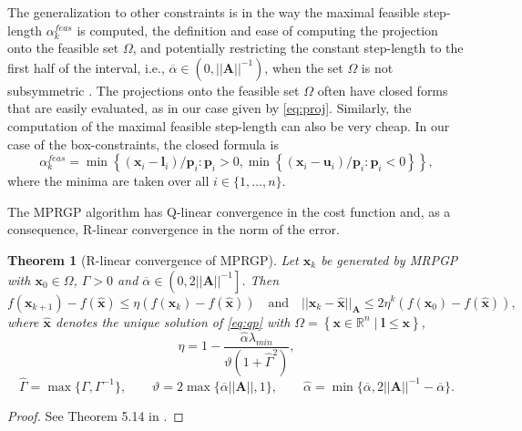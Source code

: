 \documentclass[11pt]{article}
\theoremstyle{plain}
\newtheorem{theorem}{Theorem}[section]
\theoremstyle{definition}
\newcommand{\Vl}{\bm{l}}
\newcommand{\Vp}{\bm{p}}
\newcommand{\Vu}{\bm{u}}
\newcommand{\Vx}{\bm{x}}
\newcommand{\MA}{\bm{A}}
\begin{document}

The generalization to other constraints is in the way the maximal feasible step-length $\alpha_k^{feas}$ is computed, the definition and ease of computing the projection onto the feasible set $\Omega$, and potentially restricting the constant step-length to the first half of the interval, i.e., $\overline{\alpha} \in (0,||\MA||^{-1})$, when the set $\Omega$ is not subsymmetric \cite{Bouchala2014,Bouchala2012}.
The projections onto the feasible set $\Omega$ often have closed forms that are easily evaluated, as in our case given by \cref{eq:proj}.
Similarly, the computation of the maximal feasible step-length can also be very cheap.
In our case of the box-constraints, the closed formula is
\begin{equation*}
  \alpha_k^{feas} = \min \left\{\left(\Vx_i-\Vl_i\right)/\Vp_i : \Vp_i > 0, \min \left\{\left(\Vx_i-\Vu_i\right)/\Vp_i : \Vp_i < 0\right\} \right\},
\end{equation*}
where the minima are taken over all $i \in \{1,\dots,n\}$.

The MPRGP algorithm has Q-linear convergence in the cost function and, as a consequence, R-linear convergence in the norm of the error.
\begin{theorem}[R-linear convergence of MPRGP]
  Let $\Vx_k$ be generated by MRPGP with $\Vx_0 \in \Omega$, $\Gamma > 0$ and $\overline{\alpha} \in \left(0,2||\MA||^{-1}\right]$. Then
  \begin{equation*}
    f(\Vx_{k+1}) - f(\widehat{\Vx}) \le \eta\left( f(\Vx_k) - f(\widehat{\Vx}) \right)
    \quad \text{and} \quad ||\Vx_k - \widehat{\Vx}||_{\MA} \le 2 \eta^{k} \left(f(\Vx_0) - f(\widehat{\Vx})\right),
  \end{equation*}
  where $\widehat{\Vx}$ denotes the unique solution of \eqref{eq:qp} with $\Omega = \left\{\Vx \in \mathbb{R}^n \mid \Vl \leq \Vx \right\}$,
  \begin{displaymath}
    \eta = 1 - \frac{\widehat{\alpha}\lambda_{min}}{\vartheta \left(1+\widehat{\Gamma}^2\right)},
  \end{displaymath}
  \begin{displaymath}
    \widehat{\Gamma} = \max\{ \Gamma, \Gamma^{-1}\}, \qquad \vartheta = 2\max\{\overline{\alpha}||\MA||,1\}, \qquad \widehat{\alpha} = \min \{\overline{\alpha},2||\MA||^{-1} - \overline{\alpha}\}.
  \end{displaymath}
\end{theorem}
\begin{proof}
  See Theorem 5.14 in \cite{Dos-book-09}.
\end{proof}
\end{document}
